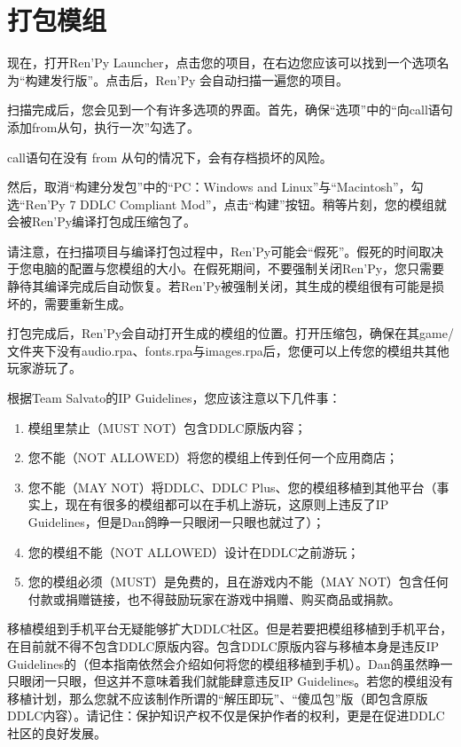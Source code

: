 \documentclass[../../Main.tex]{subfiles}
\begin{document}
\section{打包模组}
现在，打开Ren'Py Launcher，点击您的项目，在右边您应该可以找到一个选项名为“构建发行版”。点击后，Ren'Py 会自动扫描一遍您的项目。

扫描完成后，您会见到一个有许多选项的界面。首先，确保“选项”中的“向call语句添加from从句，执行一次”勾选了。
\begin{Warning}
    call语句在没有 from 从句的情况下，会有存档损坏的风险。
\end{Warning}
然后，取消“构建分发包”中的“PC：Windows and Linux”与“Macintosh”，勾选“Ren'Py 7 DDLC Compliant Mod”，点击“构建”按钮。稍等片刻，您的模组就会被Ren'Py编译打包成压缩包了。
\begin{Warning}
    请注意，在扫描项目与编译打包过程中，Ren'Py可能会“假死”。假死的时间取决于您电脑的配置与您模组的大小。在假死期间，不要强制关闭Ren'Py，您只需要静待其编译完成后自动恢复。若Ren'Py被强制关闭，其生成的模组很有可能是损坏的，需要重新生成。
\end{Warning}

打包完成后，Ren'Py会自动打开生成的模组的位置。打开压缩包，确保在其game/文件夹下没有audio.rpa、fonts.rpa与images.rpa后，您便可以上传您的模组共其他玩家游玩了。

\begin{Attention}
    根据Team Salvato的IP Guidelines，您应该注意以下几件事：
    \begin{enumerate}
        \item 模组里禁止（MUST NOT）包含DDLC原版内容；
        \item 您不能（NOT ALLOWED）将您的模组上传到任何一个应用商店；
        \item 您不能（MAY NOT）将DDLC、DDLC Plus、您的模组移植到其他平台（事实上，现在有很多的模组都可以在手机上游玩，这原则上违反了IP Guidelines，但是Dan鸽睁一只眼闭一只眼也就过了）；
        \item 您的模组不能（NOT ALLOWED）设计在DDLC之前游玩；
        \item 您的模组必须（MUST）是免费的，且在游戏内不能（MAY NOT）包含任何付款或捐赠链接，也不得鼓励玩家在游戏中捐赠、购买商品或捐款。
    \end{enumerate}
    移植模组到手机平台无疑能够扩大DDLC社区。但是若要把模组移植到手机平台，在目前就不得不包含DDLC原版内容。包含DDLC原版内容与移植本身是违反IP Guidelines的（但本指南依然会介绍如何将您的模组移植到手机）。Dan鸽虽然睁一只眼闭一只眼，但这并不意味着我们就能肆意违反IP Guidelines。若您的模组没有移植计划，那么您就不应该制作所谓的“解压即玩”、“傻瓜包”版（即包含原版DDLC内容）。请记住：保护知识产权不仅是保护作者的权利，更是在促进DDLC社区的良好发展。
\end{Attention}
\end{document}
